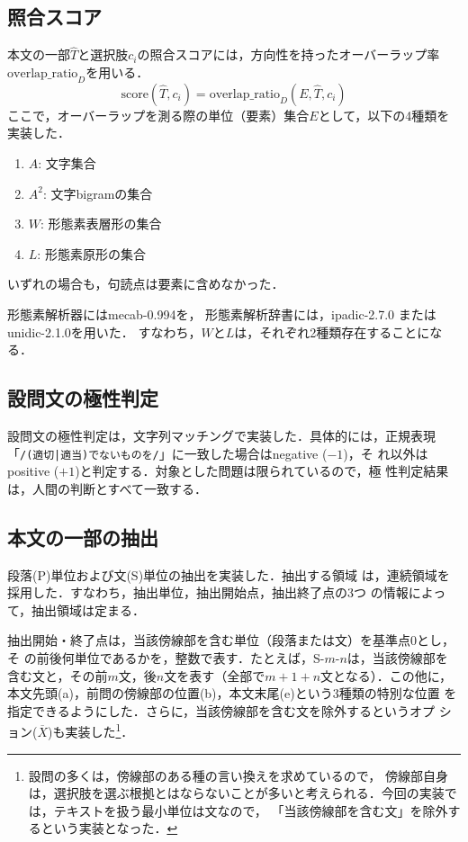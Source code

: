 \documentclass[japanese]{jnlp_1.4}
\begin{document}
\subsection{照合スコア}

本文の一部$\widehat{T}$と選択肢$c_i$の照合スコアには，方向性を持ったオーバーラップ率
$\mathrm{overlap\_ratio}_D$を用いる．
\begin{equation}
\mathrm{score}(\widehat{T}, c_i) = \mathrm{overlap\_ratio}_D(E, \widehat{T}, c_i)
\end{equation}
ここで，オーバーラップを測る際の単位（要素）集合$E$として，以下の4種類を実装した．
\begin{enumerate}
\item $A$: 文字集合
\item $A^2$: 文字bigramの集合
\item $W$: 形態素表層形の集合
\item $L$: 形態素原形の集合
\end{enumerate}
いずれの場合も，句読点は要素に含めなかった．

形態素解析器にはmecab-0.994を，
形態素解析辞書には，ipadic-2.7.0 または unidic-2.1.0を用いた．
すなわち，$W$と$L$は，それぞれ2種類存在することになる．


\subsection{設問文の極性判定}

設問文の極性判定は，文字列マッチングで実装した．具体的には，正規表現
「\verb+/(適切|適当)でないものを/+」に一致した場合はnegative ($-1$)，そ
れ以外はpositive ($+1$)と判定する．対象とした問題は限られているので，極
性判定結果は，人間の判断とすべて一致する．


\subsection{本文の一部の抽出}

段落(P)単位および文(S)単位の抽出を実装した．抽出する領域
は，連続領域を採用した．すなわち，抽出単位，抽出開始点，抽出終了点の3つ
の情報によって，抽出領域は定まる．

抽出開始・終了点は，当該傍線部を含む単位（段落または文）を基準点0とし，そ
の前後何単位であるかを，整数で表す．たとえば，S-$m$-$n$は，当該傍線部を
含む文と，その前$m$文，後$n$文を表す（全部で$m+1+n$文となる）．この他に，
本文先頭(a)，前問の傍線部の位置(b)，本文末尾(e)という3種類の特別な位置
を指定できるようにした．さらに，当該傍線部を含む文を除外するというオプ
ション($\overline{X}$)も実装した\footnote{
設問の多くは，傍線部のある種の言い換えを求めているので，
傍線部自身は，選択肢を選ぶ根拠とはならないことが多いと考えられる．今回の実装では，テキストを扱う最小単位は文なので，
「当該傍線部を含む文」を除外するという実装となった．}．
\end{document}
